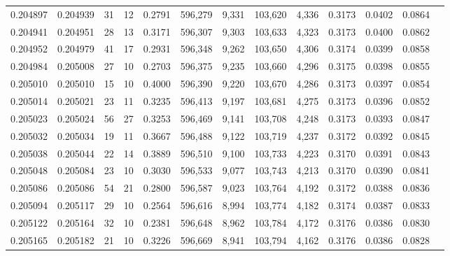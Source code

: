 \begin{tabular}{rrrrrrrrrrrrr}
0.204897 & 0.204939 &    31 &  12 &                                     0.2791 & 596,279 &   9,331 & 103,620 &   4,336 & 0.3173 & 0.0402 & 0.0864 \\
0.204941 & 0.204951 &    28 &  13 &                                     0.3171 & 596,307 &   9,303 & 103,633 &   4,323 & 0.3173 & 0.0400 & 0.0862 \\
0.204952 & 0.204979 &    41 &  17 &                                     0.2931 & 596,348 &   9,262 & 103,650 &   4,306 & 0.3174 & 0.0399 & 0.0858 \\
0.204984 & 0.205008 &    27 &  10 &                                     0.2703 & 596,375 &   9,235 & 103,660 &   4,296 & 0.3175 & 0.0398 & 0.0855 \\
0.205010 & 0.205010 &    15 &  10 &                                     0.4000 & 596,390 &   9,220 & 103,670 &   4,286 & 0.3173 & 0.0397 & 0.0854 \\
0.205014 & 0.205021 &    23 &  11 &                                     0.3235 & 596,413 &   9,197 & 103,681 &   4,275 & 0.3173 & 0.0396 & 0.0852 \\
0.205023 & 0.205024 &    56 &  27 &                                     0.3253 & 596,469 &   9,141 & 103,708 &   4,248 & 0.3173 & 0.0393 & 0.0847 \\
0.205032 & 0.205034 &    19 &  11 &                                     0.3667 & 596,488 &   9,122 & 103,719 &   4,237 & 0.3172 & 0.0392 & 0.0845 \\
0.205038 & 0.205044 &    22 &  14 &                                     0.3889 & 596,510 &   9,100 & 103,733 &   4,223 & 0.3170 & 0.0391 & 0.0843 \\
0.205048 & 0.205084 &    23 &  10 &                                     0.3030 & 596,533 &   9,077 & 103,743 &   4,213 & 0.3170 & 0.0390 & 0.0841 \\
0.205086 & 0.205086 &    54 &  21 &                                     0.2800 & 596,587 &   9,023 & 103,764 &   4,192 & 0.3172 & 0.0388 & 0.0836 \\
0.205094 & 0.205117 &    29 &  10 &                                     0.2564 & 596,616 &   8,994 & 103,774 &   4,182 & 0.3174 & 0.0387 & 0.0833 \\
0.205122 & 0.205164 &    32 &  10 &                                     0.2381 & 596,648 &   8,962 & 103,784 &   4,172 & 0.3176 & 0.0386 & 0.0830 \\
0.205165 & 0.205182 &    21 &  10 &                                     0.3226 & 596,669 &   8,941 & 103,794 &   4,162 & 0.3176 & 0.0386 & 0.0828 \\

\end{tabular}
